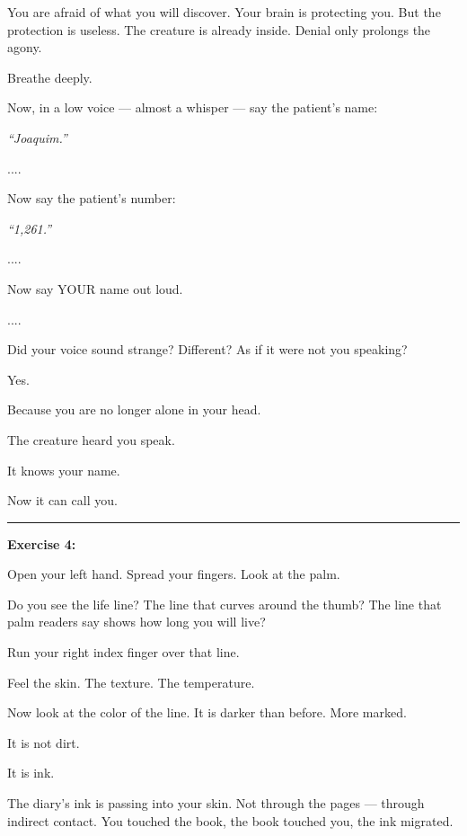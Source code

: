 \noindent You are afraid of what you will discover. Your brain is protecting you. But the protection is useless. The creature is already inside. Denial only prolongs the agony.

\noindent Breathe deeply.

\noindent Now, in a low voice --- almost a whisper --- say the patient's name:

\noindent \textit{\textquotedblleft{}Joaquim.\textquotedblright{}}

\noindent ....

\noindent Now say the patient's number:

\noindent \textit{\textquotedblleft{}1,261.\textquotedblright{}}

\noindent ....

\noindent Now say YOUR name out loud.

\noindent ....

\noindent Did your voice sound strange? Different? As if it were not you speaking?

\noindent Yes.

\noindent Because you are no longer alone in your head.

\noindent The creature heard you speak.

\noindent It knows your name.

\noindent Now it can call you.

\vspace{0.5em}\noindent\rule{\textwidth}{0.5pt}\vspace{0.5em}

\noindent \textbf{Exercise 4:}

\noindent Open your left hand. Spread your fingers. Look at the palm.

\noindent Do you see the life line? The line that curves around the thumb? The line that palm readers say shows how long you will live?

\noindent Run your right index finger over that line.

\noindent Feel the skin. The texture. The temperature.

\noindent Now look at the color of the line. It is darker than before. More marked.

\noindent It is not dirt.

\noindent It is ink.

\noindent The diary's ink is passing into your skin. Not through the pages --- through indirect contact. You touched the book, the book touched you, the ink migrated.

